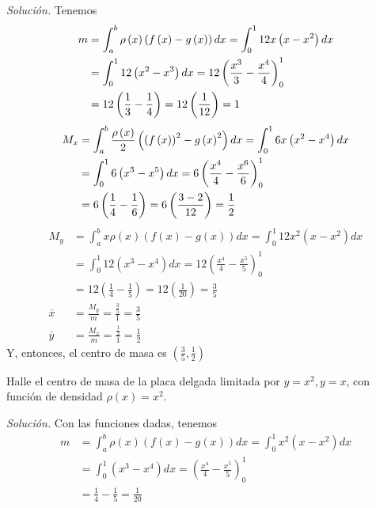 \textit{Solución.} Tenemos
{\small
\begin{align*}
m&=\int_{a}^{b}\rho \left( x\right) \left( f\left( x\right) -g\left(
x\right) \right) dx=\int_{0}^{1}12x\left( x-x^{2}\right) dx\\
&=\int_{0}^{1}12\left( x^{2}-x^{3}\right) dx=12\left( \frac{x^{3}}{3}-\frac{%
x^{4}}{4}\right) _{0}^{1}\\
&=12\left( \frac{1}{3}-\frac{1}{4}\right) =12\left( \frac{1}{12}\right)=1\\
\end{align*}
}
{\small
\begin{align*}
M_{x}&=\int_{a}^{b}\frac{\rho \left( x\right) }{2}\left( \left( f\left(
x\right) \right) ^{2}-g\left( x\right) ^{2}\right) dx=\int_{0}^{1}6x\left(
x^{2}-x^{4}\right) dx\\
&=\int_{0}^{1}6\left( x^{3}-x^{5}\right) dx=6\left( \frac{x^{4}}{4}-\frac{%
x^{6}}{6}\right) _{0}^{1}\\
&=6\left( \frac{1}{4}-\frac{1}{6}\right) =6\left( \frac{3-2}{12}\right)
=\frac{1}{2}\\
\end{align*}
}
{\small
\begin{align*}
M_{y}&=\int_{a}^{b}x\rho \left( x\right) \left( f\left( x\right) -g\left(
x\right) \right) dx=\int_{0}^{1}12x^{2}\left( x-x^{2}\right) dx\\
&=\int_{0}^{1}12\left( x^{3}-x^{4}\right) dx=12\left( \frac{x^{4}}{4}-\frac{
x^{5}}{5}\right) _{0}^{1}\\
&=12\left( \frac{1}{4}-\frac{1}{5}\right) =12\left(\frac{1}{20}\right)=\frac{3}{5}\\
\overline{x}&=\frac{M_{y}}{m}=\frac{\frac{3}{5}}{1}=\frac{3}{5}\\
\overline{y}&=\frac{M_{x}}{m}=\frac{\frac{1}{2}}{1}=\frac{1}{2}
\end{align*}
}
Y, entonces, el centro de masa es $\left( \frac{3}{5},\frac{1}{2}\right) $

\begin{ejemplo}
\textnormal{Halle el centro de masa de la placa delgada limitada por \textit{$%
y=x^{2},y=x$}, con función de densidad \textit{$\rho \left( x\right) =x^{2}.$}}
\end{ejemplo}

\textit{Solución.} Con las funciones dadas, tenemos
\begin{align*}
m&=\int_{a}^{b}\rho \left( x\right) \left( f\left( x\right) -g\left(
x\right) \right) dx=\int_{0}^{1}x^{2}\left( x-x^{2}\right) dx\\
&=\int_{0}^{1}\left( x^{3}-x^{4}\right) dx=\left( \frac{x^{4}}{4}-\frac{x^{5}%
}{5}\right) _{0}^{1}\\
&=\frac{1}{4}-\frac{1}{5}
=\frac{1}{20}\\
\end{align*}

